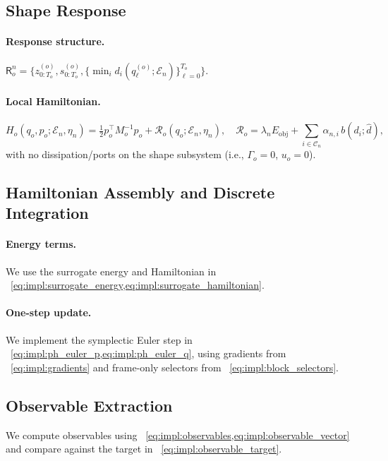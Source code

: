 \documentclass{article} %
\begin{document}
\subsection{Shape Response}
\label{subsec:shape_response}

\paragraph{Response structure.}
$\mathsf{R}_o^n=\{z_{0:T_o}^{(o)},s_{0:T_o}^{(o)},\{\min_i d_i(q_\ell^{(o)};\mathcal{E}_n)\}_{\ell=0}^{T_o}\}$.

\paragraph{Local Hamiltonian.}
\[
H_o(q_o,p_o;\mathcal{E}_n,\eta_n)
=\tfrac12 p_o^\top M_o^{-1}p_o+\mathcal{R}_o(q_o;\mathcal{E}_n,\eta_n),
\quad
\mathcal{R}_o=\lambda_n E_{\mathrm{obj}}+\sum_{i\in\mathcal{C}_n}\alpha_{n,i}\,b(d_i;\hat d),
\]
with no dissipation/ports on the shape subsystem (i.e., $\Gamma_o=0$, $u_o=0$).

\subsection{Hamiltonian Assembly and Discrete Integration}
\label{subsec:symplectic_integration}

\paragraph{Energy terms.}
We use the surrogate energy and Hamiltonian in ~\cref{eq:impl:surrogate_energy,eq:impl:surrogate_hamiltonian}.

\paragraph{One-step update.}
We implement the symplectic Euler step in ~\cref{eq:impl:ph_euler_p,eq:impl:ph_euler_q}, using gradients from
~\cref{eq:impl:gradients} and frame-only selectors from ~\cref{eq:impl:block_selectors}.

\subsection{Observable Extraction}
\label{subsec:observable_extraction}

We compute observables using ~\cref{eq:impl:observables,eq:impl:observable_vector} and compare against the target
in ~\cref{eq:impl:observable_target}.
\end{document}
